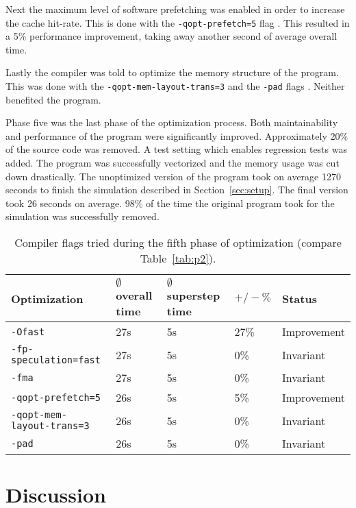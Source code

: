 \documentclass[twoside,11pt]{article}
\begin{document}
Next the maximum level of software prefetching was enabled in order to
increase the cache hit-rate.
This is done with the \texttt{-qopt-prefetch=5} flag
\citep{qopt_prefetch}.
This resulted in a 5\% performance improvement, taking away another
second of average overall time.

Lastly the compiler was told to optimize the memory structure of the
program.
This was done with the \texttt{-qopt-mem-layout-trans=3} and the
\texttt{-pad} flags \citep{qopt_mem_layout_trans, pad}.
Neither benefited the program.

Phase five was the last phase of the optimization process.
Both maintainability and performance of the program were significantly
improved.
Approximately 20\% of the source code was removed.
A test setting which enables regression tests was added.
The program was successfully vectorized and the memory usage was cut
down drastically.
The unoptimized version of the program took on average 1270 seconds
to finish the simulation described in Section~\ref{sec:setup}.
The final version took 26 seconds on average.
98\% of the time the original program took for the simulation was
successfully removed.

\begin{table}
  \begin{tabu}{|X|l|l|l|l|}
    \hline
    Optimization &$\emptyset$ overall time
                 &$\emptyset$ superstep time  &$+/-\%$ &Status \\
    \hline
    \texttt{-Ofast} &27s &5s &27\% &Improvement \\
    \hline
    \texttt{-fp-speculation=fast} &27s &5s &0\% &Invariant \\
    \hline
    \texttt{-fma} &27s &5s &0\% &Invariant \\
    \hline
    \texttt{-qopt-prefetch=5} &26s &5s &5\% &Improvement \\
    \hline
    \texttt{-qopt-mem-layout-trans=3} &26s &5s &0\% &Invariant \\
    \hline
    \texttt{-pad} &26s &5s &0\% &Invariant \\
    \hline
  \end{tabu}
  \caption{Compiler flags tried during the fifth phase of
    optimization (compare Table~\ref{tab:p2}).}
  \label{tab:p5}
\end{table}



\section{Discussion} %
\label{sec:dis}
\end{document}
